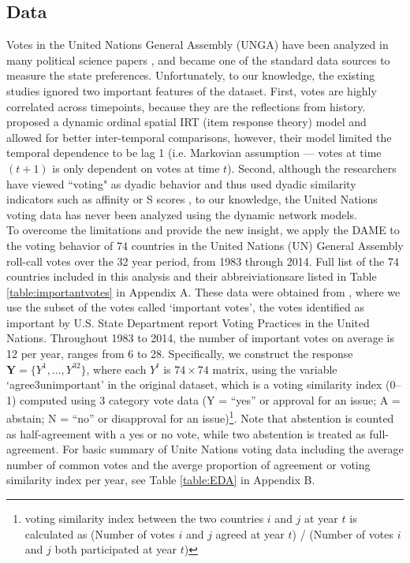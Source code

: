 \documentclass[a4paper]{article}
\begin{document}
\subsection{Data}\label{subsec: data processing}
Votes in the United Nations General Assembly (UNGA) have been analyzed in many political science papers \citep{voeten2000clashes,voeten2004resisting,bearce2007intergovernmental,mattes2015leadership,bailey2017estimating}, and became one of the standard data sources to measure the state preferences. Unfortunately, to our knowledge, the existing studies ignored two important features of the dataset. First, votes are highly correlated across timepoints, because they are the reflections from history. \cite{bailey2017estimating} proposed a dynamic ordinal spatial IRT (item response theory) model and allowed for better inter-temporal comparisons, however, their model limited the temporal dependence to be lag 1 (i.e. Markovian assumption --- votes at time $(t+1)$ is only dependent on votes at time $t$). Second, although the researchers have viewed ``voting" as dyadic behavior and thus used dyadic similarity indicators such as affinity or S scores \citep{gartzke1998kant,signorino1999tau}, to our knowledge, the United Nations voting data has never been analyzed using the dynamic network models. \\ \newline
To overcome the limitations and provide the new insight, we apply the DAME to the voting behavior of 74 countries in the United Nations (UN) General Assembly roll-call votes over the 32 year period, from 1983 through 2014. Full list of the 74 countries included in this analysis and their abbreiviationsare listed in Table \ref{table:importantvotes} in Appendix A. These data were obtained from \cite{12379_2016}, where we use the subset of the votes called `important votes', the votes identified as important by U.S. State Department report Voting Practices in the United Nations. Throughout 1983 to 2014, the number of important votes on average is 12 per year, ranges from 6 to 28. Specifically, we construct the response $\mathbf{Y} = \{Y^1,\ldots, Y^{32}\}$, where each $Y^t$ is $74 \times 74$ matrix, using the variable `agree3unimportant' in the original dataset, which is a voting similarity index (0--1) computed using 3 category vote data (Y = “yes” or approval for an issue; A = abstain; N = “no” or disapproval for an issue)\footnote{voting similarity index between the two countries $i$ and $j$ at year $t$ is calculated as (Number of votes $i$ and $j$ agreed at year $t$) / (Number of votes $i$ and $j$ both participated at year $t$)}. Note that abstention is counted as half-agreement with a yes or no vote, while two abstention is treated as full-agreement. For basic summary of Unite Nations voting data including the average number of common votes and the averge proportion of agreement or voting similarity index per year, see Table \ref{table:EDA} in Appendix B. \\ \newline
\end{document}
